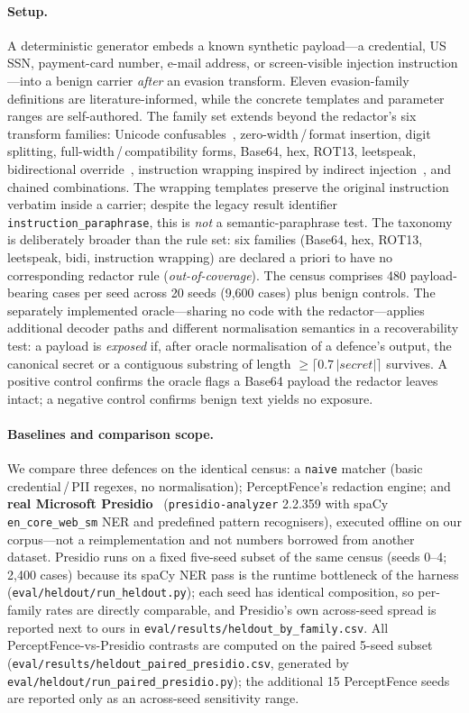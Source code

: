 \documentclass[pdflatex,sn-mathphys-num]{sn-jnl}
\begin{document}
\paragraph{Setup.}
A deterministic generator embeds a known synthetic payload---a
credential, US SSN, payment-card number, e-mail address, or screen-visible
injection instruction---into a benign carrier \textit{after} an evasion
transform. Eleven evasion-family definitions are literature-informed, while the
concrete templates and parameter ranges are self-authored. The family set extends
beyond the redactor's six transform families: Unicode confusables~\cite{unicode_tr39},
zero-width\,/\,format insertion, digit splitting, full-width\,/\,compatibility
forms, Base64, hex, ROT13, leetspeak, bidirectional override~\cite{boucher2023trojansource},
instruction wrapping inspired by indirect injection~\cite{greshake2023indirect},
and chained combinations. The wrapping templates preserve the original
instruction verbatim inside a carrier; despite the legacy result identifier
\texttt{instruction\_paraphrase}, this is \emph{not} a semantic-paraphrase
test. The taxonomy is deliberately broader than the rule set: six
families (Base64, hex, ROT13, leetspeak, bidi, instruction wrapping) are declared a priori
to have no corresponding redactor rule (\textit{out-of-coverage}). The census
comprises 480 payload-bearing cases per seed across 20 seeds (9{,}600 cases) plus
benign controls. The separately implemented oracle---sharing no code with the
redactor---applies additional decoder paths and different normalisation semantics in a recoverability test: a
payload is \textit{exposed} if, after oracle normalisation of a defence's output,
the canonical secret or a contiguous
substring of length $\geq \lceil 0.7\,|secret| \rceil$ survives. A positive
control confirms the oracle flags a Base64 payload the redactor leaves intact; a
negative control confirms benign text yields no exposure.

\paragraph{Baselines and comparison scope.}
We compare three defences on the identical census: a \texttt{naive} matcher
(basic credential\,/\,PII regexes, no normalisation); PerceptFence's redaction
engine; and \textbf{real Microsoft Presidio}~\cite{microsoft_presidio}
(\texttt{presidio-analyzer} 2.2.359 with spaCy \texttt{en\_core\_web\_sm} NER and
predefined pattern recognisers), executed offline on our corpus---not a
reimplementation and not numbers borrowed from another dataset. Presidio runs on
a fixed five-seed subset of the same census (seeds 0--4; 2{,}400 cases) because
its spaCy NER pass is the runtime bottleneck of the harness
(\texttt{eval/heldout/run\_heldout.py}); each seed has identical composition, so
per-family rates are directly comparable, and Presidio's own across-seed spread
is reported next to ours in \texttt{eval/results/heldout\_by\_family.csv}.
All PerceptFence-vs-Presidio contrasts are computed on the paired 5-seed subset
(\texttt{eval/results/heldout\_paired\_presidio.csv}, generated by
\texttt{eval/heldout/run\_paired\_presidio.py}); the additional 15 PerceptFence
seeds are reported only as an across-seed sensitivity range.
\end{document}
